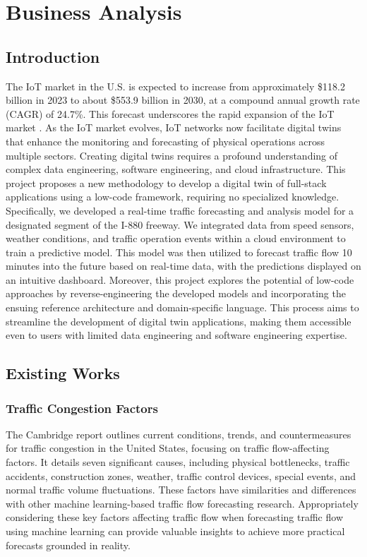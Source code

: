 \chapter{Business Analysis}

\section{Introduction}
 The IoT market in the U.S. is expected to increase from approximately \$118.2 billion in 2023 to about \$553.9 billion in 2030, at a compound annual growth rate (CAGR) of 24.7\%. This forecast underscores the rapid expansion of the IoT market \autocite{fortune2020us}. As the IoT market evolves, IoT networks now facilitate digital twins that enhance the monitoring and forecasting of physical operations across multiple sectors. Creating digital twins requires a profound understanding of complex data engineering, software engineering, and cloud infrastructure. This project proposes a new methodology to develop a digital twin of full-stack applications using a low-code framework, requiring no specialized knowledge. Specifically, we developed a real-time traffic forecasting and analysis model for a designated segment of the I-880 freeway. We integrated data from speed sensors, weather conditions, and traffic operation events within a cloud environment to train a predictive model. This model was then utilized to forecast traffic flow 10 minutes into the future based on real-time data, with the predictions displayed on an intuitive dashboard. Moreover, this project explores the potential of low-code approaches by reverse-engineering the developed models and incorporating the ensuing reference architecture and domain-specific language. This process aims to streamline the development of digital twin applications, making them accessible even to users with limited data engineering and software engineering expertise.

\section{Existing Works}\label{sec:existing_works}

\subsection{Traffic Congestion Factors}
 The Cambridge \citet{systematics2005traffic} report outlines current conditions, trends, and countermeasures for traffic congestion in the United States, focusing on traffic flow-affecting factors. It details seven significant causes, including physical bottlenecks, traffic accidents, construction zones, weather, traffic control devices, special events, and normal traffic volume fluctuations. These factors have similarities and differences with other machine learning-based traffic flow forecasting research. Appropriately considering these key factors affecting traffic flow when forecasting traffic flow using machine learning can provide valuable insights to achieve more practical forecasts grounded in reality.

